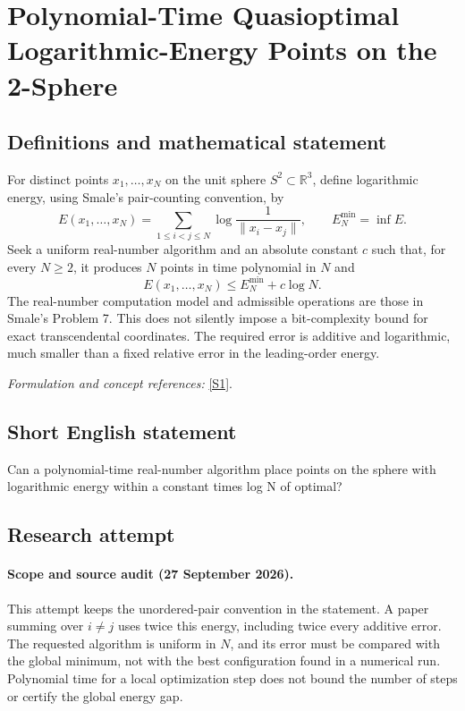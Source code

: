 \documentclass[11pt]{article}
\begin{document}
\section*{\texorpdfstring{Polynomial-Time Quasioptimal Logarithmic-Energy Points on the 2-Sphere}{Polynomial-Time Quasioptimal Logarithmic-Energy Points on the 2-Sphere}}\label{30006958}
\subsection{Definitions and mathematical statement}
For distinct points $x_1,\ldots,x_N$ on the unit sphere $S^2\subset{\mathbb{R}}^3$, define logarithmic energy, using Smale's pair-counting convention, by
\[
 E(x_1,\ldots,x_N)=\sum_{1\le i<j\le N}
 \log\frac1{\|x_i-x_j\|},\qquad E_N^{\min}=\inf E.
\]
Seek a uniform real-number algorithm and an absolute constant $c$ such that, for every $N\ge2$, it produces $N$ points in time polynomial in $N$ and
\[
 E(x_1,\ldots,x_N)\le E_N^{\min}+c\log N.
\]
The real-number computation model and admissible operations are those in Smale's Problem 7. This does not silently impose a bit-complexity bound for exact transcendental coordinates. The required error is additive and logarithmic, much smaller than a fixed relative error in the leading-order energy.
\par\smallskip\textit{Formulation and concept references:} \href{https://www.cityu.edu.hk/ma/doc/people/smales/pap104.pdf}{[S1]}.

\subsection{Short English statement}
Can a polynomial-time real-number algorithm place points on the sphere with logarithmic energy within a constant times log N of optimal?
\subsection{Research attempt}
\paragraph{Scope and source audit (27 September 2026).}
This attempt keeps the unordered-pair convention in the statement. A
paper summing over $i\ne j$ uses twice this energy, including twice every
additive error. The requested algorithm is uniform in $N$, and its error
must be compared with the global minimum, not with the best configuration
found in a numerical run. Polynomial time for a local optimization step
does not bound the number of steps or certify the global energy gap.
\end{document}
